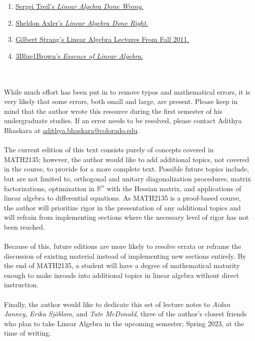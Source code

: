 \begin{enumerate}
    \item \href{https://www.math.brown.edu/streil/papers/LADW/LADW_2017-09-04.pdf}{Sergei Treil's \textit{Linear Algebra Done Wrong}.}
    \item \href{https://link.springer.com/book/10.1007/978-3-319-11080-6?utm_medium=affiliate&utm_source=commission_junction_authors&utm_campaign=CONR_BOOKS_ECOM_GL_PHSS_ALWYS_DEEPLINK&utm_content=deeplink&utm_term=PID100197440&CJEVENT=f9f74b076a4c11ed80fe023d0a1c0e0d}{Sheldon Axler's \textit{Linear Algebra Done Right}.}
    \item \href{https://youtube.com/playlist?list=PL221E2BBF13BECF6C}{Gilbert Strang's Linear Algebra Lectures From Fall 2011.}
    \item \href{https://www.youtube.com/playlist?app=desktop&list=PLZHQObOWTQDPD3MizzM2xVFitgF8hE_ab}{3Blue1Brown's \textit{Essence of Linear Algebra}.}
\end{enumerate}
\vphantom
\\
\\
While much effort has been put in to remove typos and mathematical errors, it is very likely that some errors, both small and large, are present. Please keep in mind that the author wrote this resource during the first semester of his undergraduate studies. If an error needs to be resolved, please contact Adithya Bhaskara at \href{mailto:adithya.bhaskara@colorado.edu}{adithya.bhaskara@colorado.edu}.
\pagebreak
\\
\\
The current edition of this text consists purely of concepts covered in MATH2135; however, the author would like to add additional topics, not covered in the course, to provide for a more complete text. Possible future topics include, but are not limited to, orthogonal and unitary diagonalization procedures, matrix factorizations, optimization in \(\mathbb{R}^n\) with the Hessian matrix, and applications of linear algebra to differential equations. As MATH2135 is a proof-based course, the author will prioritize rigor in the presentation of any additional topics and will refrain from implementing sections where the necessary level of rigor has not been reached.
\\
\\
Because of this, future editions are more likely to resolve errata or reframe the discussion of existing material instead of implementing new sections entirely. By the end of MATH2135, a student will have a degree of mathematical maturity enough to make inroads into additional topics in linear algebra without direct instruction.
\\
\\
Finally, the author would like to dedicate this set of lecture notes to \textit{Aidan Janney}, \textit{Erika Sj\"{o}blom}, and \textit{Tate McDonald}, three of the author's closest friends who plan to take Linear Algebra in the upcoming semester; Spring 2023, at the time of writing.
\\
\\
\vfill
{}